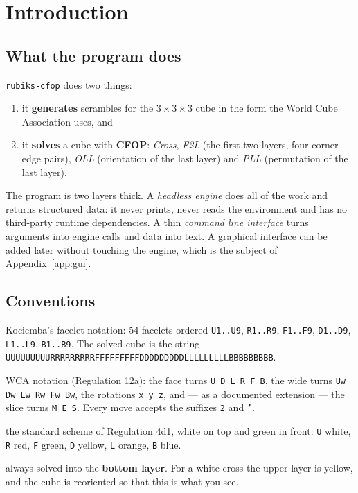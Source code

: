 \section{Introduction}
\label{sec:intro}

\subsection{What the program does}

\texttt{rubiks-cfop} does two things:

\begin{enumerate}[leftmargin=1.4em]
  \item it \textbf{generates} scrambles for the $3\times3\times3$ cube in the form
        the World Cube Association uses, and
  \item it \textbf{solves} a cube with \textbf{CFOP}: \emph{Cross}, \emph{F2L}
        (the first two layers, four corner--edge pairs), \emph{OLL} (orientation of
        the last layer) and \emph{PLL} (permutation of the last layer).
\end{enumerate}

The program is two layers thick.  A \emph{headless engine} does all of the work and
returns structured data: it never prints, never reads the environment and has no
third-party runtime dependencies.  A thin \emph{command line interface} turns
arguments into engine calls and data into text.  A graphical interface can be
added later without touching the engine, which is the subject of
Appendix~\ref{app:gui}.

\subsection{Conventions}

\begin{description}[leftmargin=0em,style=nextline]
  \item[Cube representation] Kociemba's facelet notation: 54 facelets ordered
  \texttt{U1..U9}, \texttt{R1..R9}, \texttt{F1..F9}, \texttt{D1..D9},
  \texttt{L1..L9}, \texttt{B1..B9}.  The solved cube is the string
  \texttt{UUUUUUUUURRRRRRRRRFFFFFFFFFDDDDDDDDDLLLLLLLLLBBBBBBBBB}.
  \item[Moves] WCA notation (Regulation 12a): the face turns
  \texttt{U D L R F B}, the wide turns \texttt{Uw Dw Lw Rw Fw Bw}, the rotations
  \texttt{x y z}, and --- as a documented extension --- the slice turns
  \texttt{M E S}.  Every move accepts the suffixes \texttt{2} and \texttt{'}.
  \item[Colors] the standard scheme of Regulation 4d1, white on top and green in
  front: \texttt{U} white, \texttt{R} red, \texttt{F} green, \texttt{D} yellow,
  \texttt{L} orange, \texttt{B} blue.
  \item[Cross] always solved into the \textbf{bottom layer}.  For a white cross the
  upper layer is yellow, and the cube is reoriented so that this is what you see.
\end{description}


